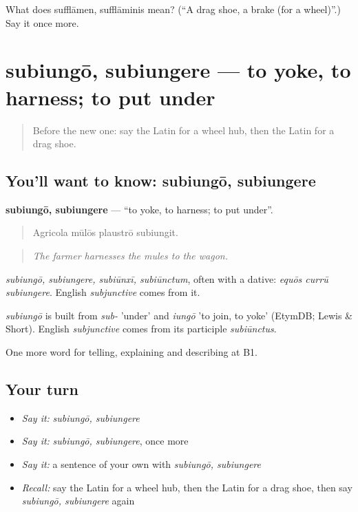 \begin{tcolorbox}[breakable,colback=teal!4,colframe=teal!35!black,title={Before you move on}]
What does sufflāmen, sufflāminis mean? (\textquotedblleft{}A drag shoe, a brake (for a wheel)\textquotedblright{}.) Say it once more.
\end{tcolorbox}
\section[subiungō, subiungere]{subiungō, subiungere — to yoke, to harness; to put under}

\label{lesson:LA-C430-subiungo}



\begin{quote}
Before the new one: say the Latin for a wheel hub, then the Latin for a drag shoe.
\end{quote}

\subsection*{You'll want to know: subiungō, subiungere}
\textbf{subiungō, subiungere} — \textquotedblleft{}to yoke, to harness; to put under\textquotedblright{}.

\begin{quote}
Agricola mūlōs plaustrō subiungit.
\end{quote}

\begin{quote}
\emph{The farmer harnesses the mules to the wagon.}
\end{quote}

\emph{subiungō, subiungere, subiūnxī, subiūnctum}, often with a dative: \emph{equōs currū subiungere}. English \emph{subjunctive} comes from it.

\begin{cousinweb}
\emph{subiungō} is built from \emph{sub-} 'under' and \emph{iungō} 'to join, to yoke' (EtymDB; Lewis \& Short). English \emph{subjunctive} comes from its participle \emph{subiūnctus}.
\end{cousinweb}

\begin{grammarlens}[title={What you've built}]
One more word for telling, explaining and describing at B1.
\end{grammarlens}

\subsection*{Your turn}
\begin{itemize}
\raggedright
  \item \emph{Say it:} \emph{subiungō, subiungere}
  \item \emph{Say it:} \emph{subiungō, subiungere}, once more
  \item \emph{Say it:} a sentence of your own with \emph{subiungō, subiungere}
  \item \emph{Recall:} say the Latin for a wheel hub, then the Latin for a drag shoe, then say \emph{subiungō, subiungere} again
\end{itemize}

